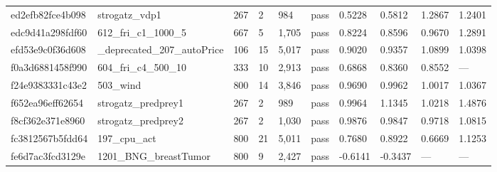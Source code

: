 \begin{longtable}{llllllllll}
ed2efb82fce4b098 & strogatz\_vdp1 & 267 & 2 & 984 & pass & 0.5228 & 0.5812 & 1.2867 & 1.2401\\
edc9d41a298fdf60 & 612\_fri\_c1\_1000\_5 & 667 & 5 & 1,705 & pass & 0.8224 & 0.8596 & 0.9670 & 1.2891\\
efd53e9c0f36d608 & \_deprecated\_207\_autoPrice & 106 & 15 & 5,017 & pass & 0.9020 & 0.9357 & 1.0899 & 1.0398\\
f0a3d6881458f990 & 604\_fri\_c4\_500\_10 & 333 & 10 & 2,913 & pass & 0.6868 & 0.8360 & 0.8552 & ---\\
f24e9383331c43e2 & 503\_wind & 800 & 14 & 3,846 & pass & 0.9690 & 0.9962 & 1.0017 & 1.0367\\
f652ea96eff62654 & strogatz\_predprey1 & 267 & 2 & 989 & pass & 0.9964 & 1.1345 & 1.0218 & 1.4876\\
f8cf362e371e8960 & strogatz\_predprey2 & 267 & 2 & 1,030 & pass & 0.9876 & 0.9847 & 0.9718 & 1.0815\\
fc3812567b5fdd64 & 197\_cpu\_act & 800 & 21 & 5,011 & pass & 0.7680 & 0.8922 & 0.6669 & 1.1253\\
fe6d7ac3fcd3129e & 1201\_BNG\_breastTumor & 800 & 9 & 2,427 & pass & -0.6141 & -0.3437 & --- & ---\\
\end{longtable}
\normalsize
